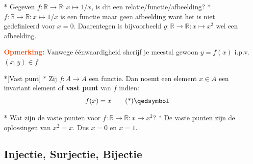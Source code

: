 \begin{niceexample}*
    Gegeven $f: \mathbb{R} \rightarrow \mathbb{R}: x \mapsto 1/x$, is dit een relatie/functie/afbeelding?
    \nextpart[Oplossing:]*
    $f: \mathbb{R} \rightarrow \mathbb{R}: x \mapsto 1/x$ is een functie maar geen afbeelding want het is niet gedefinieerd voor $x=0$. Daarentegen is bijvoorbeeld $g: \mathbb{R} \rightarrow \mathbb{R}: x \mapsto x^2$ wel een afbeelding.
\end{niceexample}

\begin{barbox}[OrangeRed][gray!5]
    \textcolor{OrangeRed}{\textbf{Opmerking:}} Vanwege éénwaardigheid shcrijf je meestal gewoon $y = f(x)$ i.p.v. $(x,y) \in f$.
\end{barbox}

\begin{nicedefinition}*[Vast punt]
    * 
    Zij $f: A \rightarrow A$ een functie. Dan noemt een element $x \in A$ een invariant element of \textbf{vast punt} van $f$ indien:
    \begin{equation}
        f(x) = x \qedtag
    \end{equation} 
\end{nicedefinition}

\begin{niceexample}*
    Wat zijn de vaste punten voor $f: \mathbb{R} \rightarrow \mathbb{R}: x \mapsto x^2$?
    \nextpart[Oplossing.]*
    De vaste punten zijn de oplossingen van $x^2=x$. Dus $x=0$ en $x=1$.
\end{niceexample}

\subsection{Injectie, Surjectie, Bijectie}


